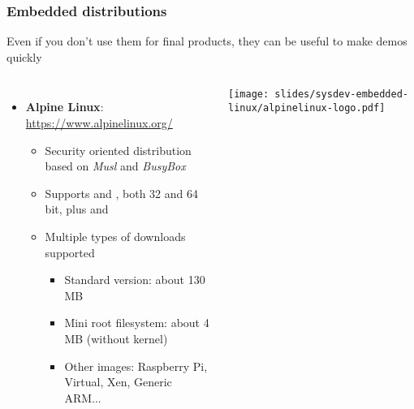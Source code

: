 \begin{frame}
  \frametitle{Embedded distributions}
  Even if you don't use them for final products, they can be useful
  to make demos quickly
  \small
  \begin{columns}
    \begin{itemize}
    \item {\bf Alpine Linux}: \url{https://www.alpinelinux.org/}\\
      \begin{itemize}
      \item Security oriented distribution based on {\em Musl} and {\em BusyBox}
      \item Supports  and , both 32 and 64 bit, plus
             and 
      \item Multiple types of downloads supported
	    \begin{itemize}
	    \item Standard version: about 130 MB
	    \item Mini root filesystem: about 4 MB (without kernel)
	    \item Other images: Raspberry Pi, Virtual, Xen, Generic ARM...
	    \end{itemize}
      \end{itemize}
    \end{itemize}
    \texttt{[image: slides/sysdev-embedded-linux/alpinelinux-logo.pdf]}\\
  \end{columns}
\end{frame}


